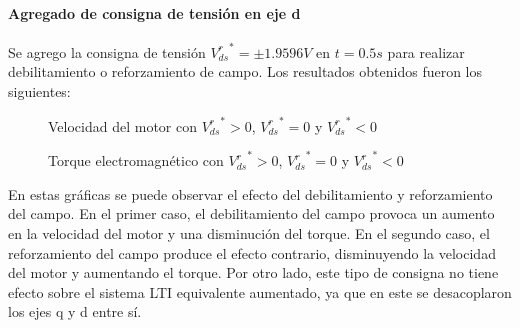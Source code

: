 \documentclass[a4paper, 10pt, onecolumn,journal]{ieeeconf}
\begin{document}
\paragraph{\textbf{Agregado de consigna de tensión en eje d}}
Se agrego la consigna de tensión ${V^r_{ds}}^* = \pm 1.9596 V $ en $t = 0.5 s$ para realizar debilitamiento o reforzamiento de campo. Los resultados obtenidos fueron los siguientes:

\begin{figure}[H]
	\centering
	\begin{adjustbox}{max width=\columnwidth}
	\end{adjustbox}
	\caption{Velocidad del motor con ${V^r_{ds}}^* > 0$, ${V^r_{ds}}^* = 0$ y ${V^r_{ds}}^* < 0$}
	\label{Velocidad del motor con ${V^r_{ds}}^* > 0$, ${V^r_{ds}}^* = 0$ y ${V^r_{ds}}^* < 0$}
\end{figure}

\begin{figure}[H]
	\centering
	\begin{adjustbox}{max width=\columnwidth}
	\end{adjustbox}
	\caption{Torque electromagnético con ${V^r_{ds}}^* > 0$, ${V^r_{ds}}^* = 0$ y ${V^r_{ds}}^* < 0$}
	\label{Torque electromagnético con ${V^r_{ds}}^* > 0$, ${V^r_{ds}}^* = 0$ y ${V^r_{ds}}^* < 0$}
\end{figure}
En estas gráficas se puede observar el efecto del debilitamiento y reforzamiento del campo. En el primer caso, el debilitamiento del campo provoca un aumento en la velocidad del motor y una disminución del torque. En el segundo caso, el reforzamiento del campo produce el efecto contrario, disminuyendo la velocidad del motor y aumentando el torque. Por otro lado, este tipo de consigna no tiene efecto sobre el sistema LTI equivalente aumentado, ya que en este se desacoplaron los ejes q y d entre sí.
\end{document}
